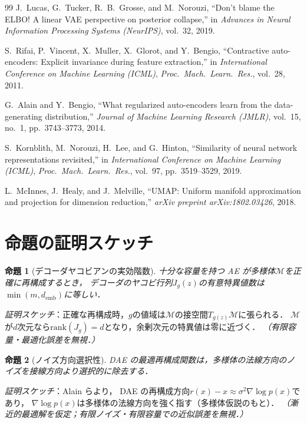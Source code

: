 \documentclass[11pt,a4paper]{jsarticle}
\newtheorem{proposition}{命題}
\newcommand{\Jg}{J_g}
\newcommand{\demb}{d_{\mathrm{emb}}}
\begin{document}
\begin{thebibliography}{99}
J.~Lucas, G.~Tucker, R.~B.~Grosse, and M.~Norouzi,
``Don't blame the ELBO! A linear VAE perspective on posterior collapse,''
in \textit{Advances in Neural Information Processing Systems (NeurIPS)}, vol.~32, 2019.

S.~Rifai, P.~Vincent, X.~Muller, X.~Glorot, and Y.~Bengio,
``Contractive auto-encoders: Explicit invariance during feature extraction,''
in \textit{International Conference on Machine Learning (ICML)},
\textit{Proc.~Mach.~Learn.~Res.}, vol.~28, 2011.

G.~Alain and Y.~Bengio,
``What regularized auto-encoders learn from the data-generating distribution,''
\textit{Journal of Machine Learning Research (JMLR)}, vol.~15, no.~1,
pp.~3743--3773, 2014.

S.~Kornblith, M.~Norouzi, H.~Lee, and G.~Hinton,
``Similarity of neural network representations revisited,''
in \textit{International Conference on Machine Learning (ICML)},
\textit{Proc.~Mach.~Learn.~Res.}, vol.~97, pp.~3519--3529, 2019.

L.~McInnes, J.~Healy, and J.~Melville,
``UMAP: Uniform manifold approximation and projection for dimension reduction,''
\textit{arXiv preprint arXiv:1802.03426}, 2018.

\end{thebibliography}

\appendix

\section{命題の証明スケッチ}\label{app:proofs}

\begin{proposition}[デコーダヤコビアンの実効階数]\label{thm:rank}
十分な容量を持つ AE が多様体$\mathcal{M}$を正確に再構成するとき，
デコーダのヤコビ行列$\Jg(z)$の有意特異値数は$\min(m, \demb)$に等しい．
\end{proposition}
\textit{証明スケッチ}：正確な再構成時，$g$の値域は$\mathcal{M}$の接空間$T_{g(z)}\mathcal{M}$に張られる．
$\mathcal{M}$が$d$次元なら$\mathrm{rank}(\Jg) = d$となり，余剰次元の特異値は零に近づく．
\textit{（有限容量・最適化誤差を無視．）}

\begin{proposition}[ノイズ方向選択性]\label{thm:nsr}
DAE の最適再構成関数は，多様体の法線方向のノイズを接線方向より選択的に除去する．
\end{proposition}
\textit{証明スケッチ}：Alain ら\cite{alain2014dae}より，
DAE の再構成方向$r(x) - x \approx \sigma^2 \nabla\log p(x)$であり，
$\nabla\log p(x)$は多様体の法線方向を強く指す（多様体仮説のもと）．
\textit{（漸近的最適解を仮定；有限ノイズ・有限容量での近似誤差を無視．）}
\end{document}
